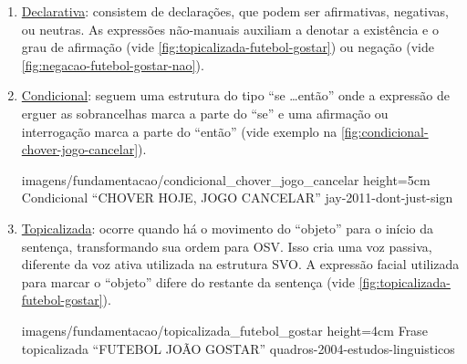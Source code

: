 \begin{enumerate}
\begin{enumerate}
        \item \underline{Declarativa}: consistem de declarações, que podem ser afirmativas, negativas, ou neutras. As expressões não-manuais auxiliam a denotar a existência e o grau de afirmação (vide \autoref{fig:topicalizada-futebol-gostar}) ou negação (vide \autoref{fig:negacao-futebol-gostar-nao}).



        \item \underline{Condicional}: seguem uma estrutura do tipo ``se \dots então'' onde a expressão de erguer as sobrancelhas marca a parte do ``se'' e uma afirmação ou interrogação marca a parte do ``então'' (vide exemplo na \autoref{fig:condicional-chover-jogo-cancelar}).
        
            {imagens/fundamentacao/condicional_chover_jogo_cancelar} %
            {height=5cm} %
            {Condicional ``CHOVER HOJE, JOGO CANCELAR''} %
            {jay-2011-dont-just-sign} %

        \item \underline{Topicalizada}: ocorre quando há o movimento do ``objeto'' para o início da sentença, transformando sua ordem para OSV. Isso cria uma voz passiva, diferente da voz ativa utilizada na estrutura SVO.
        A expressão facial utilizada para marcar o ``objeto'' difere do restante da sentença (vide \autoref{fig:topicalizada-futebol-gostar}).
        
            {imagens/fundamentacao/topicalizada_futebol_gostar} %
            {height=4cm} %
            {Frase topicalizada ``FUTEBOL JOÃO GOSTAR''} %
            {quadros-2004-estudos-linguisticos} %




\end{enumerate}
\end{enumerate}

